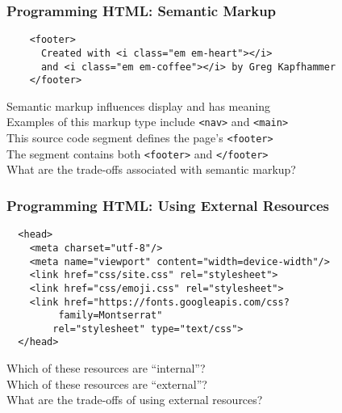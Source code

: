 \documentclass[14pt,aspectratio=169]{beamer}
\begin{document}
%
\begin{frame}[fragile]
  \frametitle{Programming HTML: Semantic Markup}
  \normalsize
  \hspace*{-.45in}
  \begin{minipage}{6in}
    \vspace*{-.15in}
    \begin{verbatim}
    <footer>
      Created with <i class="em em-heart"></i>
      and <i class="em em-coffee"></i> by Greg Kapfhammer
    </footer>
    \end{verbatim}
  \end{minipage}
  \vspace*{.05in}
  \begin{center}
    \normalsize \noindent Semantic markup influences display and has meaning \\
    \normalsize \noindent Examples of this markup type include {\tt <nav>} and {\tt <main>} \\
    \normalsize \noindent This source code segment defines the page's {\tt <footer>} \\
    \normalsize \noindent The segment contains both {\tt <footer>} and {\tt </footer>} \\
    \normalsize \noindent What are the trade-offs associated with semantic markup? \\
  \end{center}
\end{frame}

%
\begin{frame}[fragile]
  \frametitle{Programming HTML: Using External Resources}
  \normalsize
  \hspace*{-.15in}
  \begin{minipage}{6in}
    \vspace*{.15in}
    \begin{verbatim}
  <head>
    <meta charset="utf-8"/>
    <meta name="viewport" content="width=device-width"/>
    <link href="css/site.css" rel="stylesheet">
    <link href="css/emoji.css" rel="stylesheet">
    <link href="https://fonts.googleapis.com/css?
         family=Montserrat"
        rel="stylesheet" type="text/css">
  </head>
    \end{verbatim}
  \end{minipage}
  \vspace*{-.05in}
  \begin{center}
    \normalsize \noindent Which of these resources are ``internal''? \\
    \normalsize \noindent Which of these resources are ``external''? \\
    \normalsize \noindent What are the trade-offs of using external resources? \\
  \end{center}
\end{frame}
\end{document}

